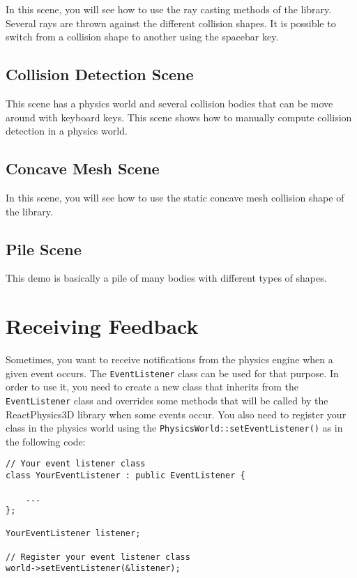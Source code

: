 \documentclass[a4paper,12pt]{article}
\begin{document}
    In this scene, you will see how to use the ray casting methods of the library. Several rays are thrown against the different collision shapes.
    It is possible to switch from a collision shape to another using the spacebar key.

   \subsection{Collision Detection Scene}

    This scene has a physics world and several collision bodies that can be move around with keyboard keys. This scene shows how to manually compute
    collision detection in a physics world.

    \subsection{Concave Mesh Scene}

    In this scene, you will see how to use the static concave mesh collision shape of the library.

    \subsection{Pile Scene}

    This demo is basically a pile of many bodies with different types of shapes.

    \section{Receiving Feedback}
    \label{sec:receiving_feedback}

    Sometimes, you want to receive notifications from the physics engine when a given event occurs. The \texttt{EventListener} class can be used for that
    purpose. In order to use it, you need to create a new class that inherits from the \texttt{EventListener} class and overrides some methods that will
    be called by the ReactPhysics3D library when some events occur. You also need to register your class in the physics world using the
    \texttt{PhysicsWorld::setEventListener()} as in the following code: \\

    \begin{lstlisting}
// Your event listener class
class YourEventListener : public EventListener {

	...
};

YourEventListener listener;

// Register your event listener class
world->setEventListener(&listener);
  \end{lstlisting}
\end{document}
